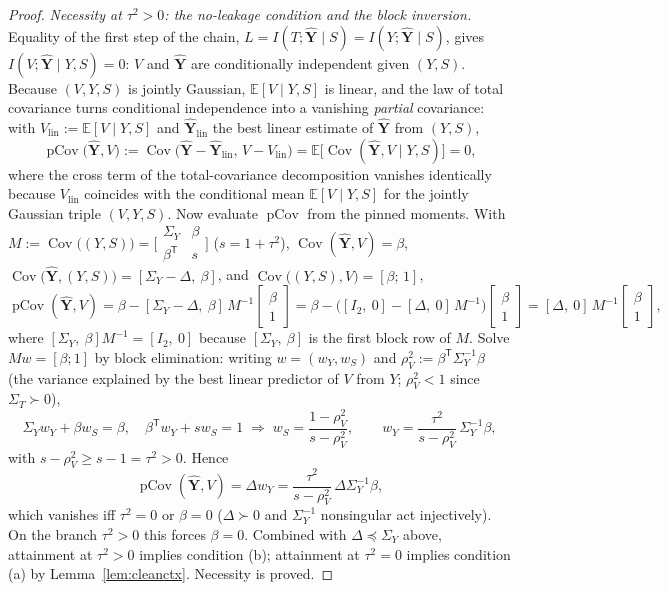 ﻿\documentclass[11pt,onecolumn]{IEEEtran}
\newcommand{\E}{\mathbb{E}}
\newcommand{\Cov}{\operatorname{Cov}}
\begin{document}
\begin{proof}
\emph{Necessity at $\tau^2>0$: the no-leakage condition and the block
inversion.} Equality of the first step of the chain,
$L=I(T;\hat{\mathbf Y}\mid S)=I(Y;\hat{\mathbf Y}\mid S)$, gives
$I(V;\hat{\mathbf Y}\mid Y,S)=0$: $V$ and $\hat{\mathbf Y}$ are
conditionally independent given $(Y,S)$. Because $(V,Y,S)$ is jointly
Gaussian, $\E[V\mid Y,S]$ is linear, and the law of total covariance
turns conditional independence into a vanishing \emph{partial}
covariance: with $V_{\mathrm{lin}}:=\E[V\mid Y,S]$ and
$\hat{\mathbf Y}_{\mathrm{lin}}$ the best linear estimate of
$\hat{\mathbf Y}$ from $(Y,S)$,
\[
\operatorname{pCov}\bigl(\hat{\mathbf Y},V\bigr)
:=\Cov\bigl(\hat{\mathbf Y}-\hat{\mathbf Y}_{\mathrm{lin}},\,
V-V_{\mathrm{lin}}\bigr)
=\E\bigl[\Cov(\hat{\mathbf Y},V\mid Y,S)\bigr]=0 ,
\]
where the cross term of the total-covariance decomposition vanishes
identically because $V_{\mathrm{lin}}$ coincides with the conditional
mean $\E[V\mid Y,S]$ for the jointly Gaussian triple $(V,Y,S)$.
Now evaluate $\operatorname{pCov}$ from the pinned moments. With
$M:=\Cov\bigl((Y,S)\bigr)=
\bigl[\begin{smallmatrix}\Sigma_Y&\beta\\
\beta^{\mathsf T}&s\end{smallmatrix}\bigr]$ ($s=1+\tau^2$),
$\Cov(\hat{\mathbf Y},V)=\beta$,
$\Cov\bigl(\hat{\mathbf Y},(Y,S)\bigr)=[\Sigma_Y-\Delta,\ \beta]$, and
$\Cov\bigl((Y,S),V\bigr)=[\beta;\,1]$,
\[
\operatorname{pCov}(\hat{\mathbf Y},V)
=\beta-[\Sigma_Y-\Delta,\ \beta]\,M^{-1}
\begin{bmatrix}\beta\\1\end{bmatrix}
=\beta-\bigl([I_2,\ 0]-[\Delta,\ 0]\,M^{-1}\bigr)
\begin{bmatrix}\beta\\1\end{bmatrix}
=[\Delta,\ 0]\,M^{-1}\begin{bmatrix}\beta\\1\end{bmatrix},
\]
where $[\Sigma_Y,\ \beta]M^{-1}=[I_2,\ 0]$ because $[\Sigma_Y,\ \beta]$
is the first block row of $M$. Solve $Mw=[\beta;1]$ by block
elimination: writing $w=(w_Y,w_S)$ and
$\rho_V^2:=\beta^{\mathsf T}\Sigma_Y^{-1}\beta$ (the variance explained
by the best linear predictor of $V$ from $Y$; $\rho_V^2<1$ since
$\Sigma_T\succ0$),
\[
\Sigma_Yw_Y+\beta w_S=\beta,\quad
\beta^{\mathsf T}w_Y+sw_S=1
\;\Longrightarrow\;
w_S=\frac{1-\rho_V^2}{s-\rho_V^2},\qquad
w_Y=\frac{\tau^2}{s-\rho_V^2}\,\Sigma_Y^{-1}\beta,
\]
with $s-\rho_V^2\ge s-1=\tau^2>0$. Hence
\[
\operatorname{pCov}(\hat{\mathbf Y},V)
=\Delta w_Y
=\frac{\tau^2}{s-\rho_V^2}\,\Delta\Sigma_Y^{-1}\beta,
\]
which vanishes iff $\tau^2=0$ or $\beta=0$ ($\Delta\succ0$ and
$\Sigma_Y^{-1}$ nonsingular act injectively). On the branch $\tau^2>0$
this forces $\beta=0$. Combined with $\Delta\preceq\Sigma_Y$ above,
attainment at $\tau^2>0$ implies condition (b); attainment at
$\tau^2=0$ implies condition (a) by Lemma~\ref{lem:cleanctx}. Necessity
is proved.


\end{proof}
\end{document}
